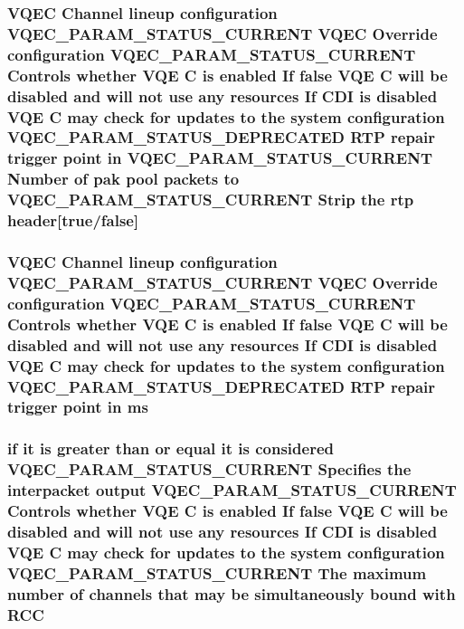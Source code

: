 \subsubsection{\setlength{\rightskip}{0pt plus 5cm}VQEC Channel lineup configuration VQEC\_\-PARAM\_\-STATUS\_\-CURRENT VQEC Override configuration VQEC\_\-PARAM\_\-STATUS\_\-CURRENT Controls whether VQE \bf{C} is enabled If false VQE \bf{C} will be disabled and will not use any resources If CDI is disabled VQE \bf{C} may check for updates \bf{to} the system configuration VQEC\_\-PARAM\_\-STATUS\_\-DEPRECATED RTP repair trigger point in VQEC\_\-PARAM\_\-STATUS\_\-CURRENT Number of pak pool packets \bf{to} VQEC\_\-PARAM\_\-STATUS\_\-CURRENT Strip the rtp \bf{header}[true/false]}\label{vqec__cfg__settings_8h_38eb5d1a6826a95e4a204cb93413b35e}


\subsubsection{\setlength{\rightskip}{0pt plus 5cm}VQEC Channel lineup configuration VQEC\_\-PARAM\_\-STATUS\_\-CURRENT VQEC Override configuration VQEC\_\-PARAM\_\-STATUS\_\-CURRENT Controls whether VQE \bf{C} is enabled If false VQE \bf{C} will be disabled and will not use any resources If CDI is disabled VQE \bf{C} may check for updates \bf{to} the system configuration VQEC\_\-PARAM\_\-STATUS\_\-DEPRECATED RTP repair trigger point in \bf{ms}}\label{vqec__cfg__settings_8h_894ec893e9cf53f3ae8342b308a652a3}


\subsubsection{\setlength{\rightskip}{0pt plus 5cm}if it is greater than or equal it is considered VQEC\_\-PARAM\_\-STATUS\_\-CURRENT Specifies the interpacket output VQEC\_\-PARAM\_\-STATUS\_\-CURRENT Controls whether VQE \bf{C} is enabled If false VQE \bf{C} will be disabled and will not use any resources If CDI is disabled VQE \bf{C} may check for updates \bf{to} the system configuration VQEC\_\-PARAM\_\-STATUS\_\-CURRENT The maximum number of \bf{channels} that may be simultaneously bound with \bf{RCC}}\label{vqec__cfg__settings_8h_7326bbcb47a7fb63f045fe49f1b1b8c9}


